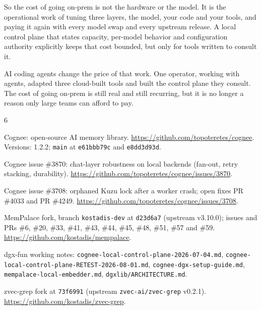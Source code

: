\documentclass[11pt]{article}
\newcommand{\code}[1]{\texttt{#1}}
\begin{document}
So the cost of going on-prem is not the hardware or the model. It is the operational work of tuning
three layers, the model, your code and your tools, and paying it again with every model swap and
every upstream release. A local control plane that states capacity, per-model behavior and
configuration authority explicitly keeps that cost bounded, but only for tools written to consult
it.

AI coding agents change the price of that work. One operator, working with agents, adapted three
cloud-built tools and built the control plane they consult. The cost of going on-prem is still real
and still recurring, but it is no longer a reason only large teams can afford to pay.

\begin{thebibliography}{6}

Cognee: open-source AI memory library.
\newblock \url{https://github.com/topoteretes/cognee}. Versions: 1.2.2; \code{main} at
\code{e61bbb79c} and \code{e8dd3d93d}.

Cognee issue \#3870: chat-layer robustness on local backends (fan-out, retry stacking, durability).
\newblock \url{https://github.com/topoteretes/cognee/issues/3870}.

Cognee issue \#3708: orphaned Kuzu lock after a worker crash; open fixes PR \#4033 and PR \#4249.
\newblock \url{https://github.com/topoteretes/cognee/issues/3708}.

MemPalace fork, branch \texttt{kostadis-dev} at \code{d23d6a7} (upstream v3.10.0); issues and PRs
\#6, \#20, \#33, \#41, \#43, \#44, \#45, \#48, \#51, \#57 and \#59.
\newblock \url{https://github.com/kostadis/mempalace}.

dgx-fun working notes: \texttt{cognee-local-control-plane-2026-07-04.md},
\texttt{cognee-local-control-plane-RETEST-2026-08-01.md}, \texttt{cognee-dgx-setup-guide.md},
\texttt{mempalace-local-embedder.md}, \texttt{dgxlib/ARCHITECTURE.md}.

zvec-grep fork at \code{73f6991} (upstream \code{zvec-ai/zvec-grep} v0.2.1).
\newblock \url{https://github.com/kostadis/zvec-grep}.

\end{thebibliography}
\end{document}
